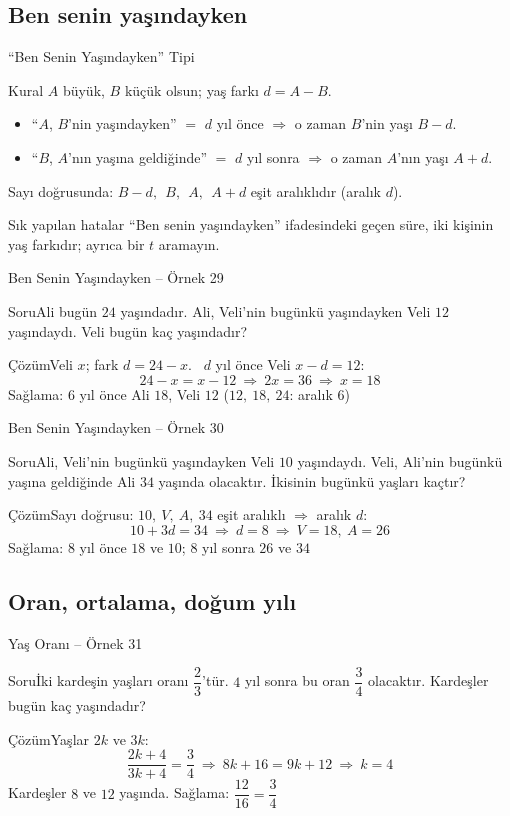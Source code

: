 \documentclass[aspectratio=169,11pt]{beamer}
\newcommand{\soru}[3]{%
\begin{frame}{#1}
  \begin{block}{Soru}\large #2\end{block}
  \pause
  \begin{exampleblock}{Çözüm}\large #3\end{exampleblock}
\end{frame}}
\begin{document}
\subsection{Ben senin yaşındayken}
\begin{frame}{``Ben Senin Yaşındayken'' Tipi}
\begin{block}{Kural}
\(A\) büyük, \(B\) küçük olsun; yaş farkı \(d=A-B\).
\begin{itemize}
\item ``\(A\), \(B\)'nin yaşındayken'' \(=\) \(d\) yıl önce \(\Rightarrow\) o zaman \(B\)'nin yaşı \(B-d\).
\item ``\(B\), \(A\)'nın yaşına geldiğinde'' \(=\) \(d\) yıl sonra \(\Rightarrow\) o zaman \(A\)'nın yaşı \(A+d\).
\end{itemize}
Sayı doğrusunda: \(B-d,\ \ B,\ \ A,\ \ A+d\) eşit aralıklıdır (aralık \(d\)).
\end{block}
\begin{alertblock}{Sık yapılan hatalar}
``Ben senin yaşındayken'' ifadesindeki geçen süre, iki kişinin yaş farkıdır; ayrıca bir \(t\) aramayın.
\end{alertblock}
\end{frame}

\soru{Ben Senin Yaşındayken -- Örnek 29}
{Ali bugün \(24\) yaşındadır. Ali, Veli'nin bugünkü yaşındayken Veli \(12\) yaşındaydı. Veli bugün kaç yaşındadır?}
{Veli \(x\); fark \(d=24-x\). \ \(d\) yıl önce Veli \(x-d=12\):
\[24-x=x-12\ \Rightarrow\ 2x=36\ \Rightarrow\ x=18\]
Sağlama: \(6\) yıl önce Ali \(18\), Veli \(12\) \checkmark \quad (\(12,\ 18,\ 24\): aralık \(6\))}

\soru{Ben Senin Yaşındayken -- Örnek 30}
{Ali, Veli'nin bugünkü yaşındayken Veli \(10\) yaşındaydı. Veli, Ali'nin bugünkü yaşına geldiğinde Ali \(34\) yaşında olacaktır. İkisinin bugünkü yaşları kaçtır?}
{Sayı doğrusu: \(10,\ V,\ A,\ 34\) eşit aralıklı \(\Rightarrow\) aralık \(d\):
\[10+3d=34\ \Rightarrow\ d=8\ \Rightarrow\ V=18,\ A=26\]
Sağlama: \(8\) yıl önce \(18\) ve \(10\); \(8\) yıl sonra \(26\) ve \(34\) \checkmark}

\subsection{Oran, ortalama, doğum yılı}
\soru{Yaş Oranı -- Örnek 31}
{İki kardeşin yaşları oranı \(\dfrac{2}{3}\)'tür. \(4\) yıl sonra bu oran \(\dfrac{3}{4}\) olacaktır. Kardeşler bugün kaç yaşındadır?}
{Yaşlar \(2k\) ve \(3k\):
\[\frac{2k+4}{3k+4}=\frac{3}{4}\ \Rightarrow\ 8k+16=9k+12\ \Rightarrow\ k=4\]
Kardeşler \(8\) ve \(12\) yaşında. \quad Sağlama: \(\dfrac{12}{16}=\dfrac{3}{4}\) \checkmark}
\end{document}
